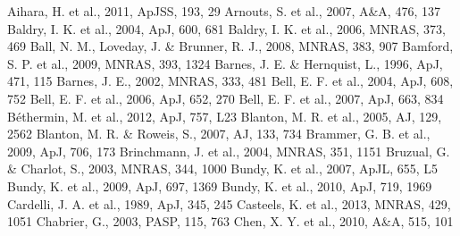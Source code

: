 \documentclass[useAMS,usenatbib]{mn2e}
\begin{document}
\begin{thebibliography}{}
 Aihara, H. et al., 2011, ApJSS, 193, 29
 Arnouts, S. et al., 2007, A\&A, 476, 137
 Baldry, I. K. et al., 2004, ApJ, 600, 681
 Baldry, I. K. et al., 2006, MNRAS, 373, 469
 Ball, N. M., Loveday, J. \& Brunner, R. J., 2008, MNRAS, 383, 907
 Bamford, S. P. et al., 2009, MNRAS, 393, 1324
 Barnes, J. E. \& Hernquist, L., 1996, ApJ, 471, 115
 Barnes, J. E., 2002, MNRAS, 333, 481
 Bell, E. F. et al., 2004, ApJ, 608, 752
 Bell, E. F. et al., 2006, ApJ, 652, 270
 Bell, E. F. et al., 2007, ApJ, 663, 834
 B\'ethermin, M. et al., 2012, ApJ, 757, L23
 Blanton, M. R. et al., 2005, AJ, 129, 2562
 Blanton, M. R. \& Roweis, S., 2007, AJ, 133, 734
 Brammer, G. B. et al., 2009, ApJ, 706, 173
 Brinchmann, J. et al., 2004, MNRAS, 351, 1151
 Bruzual, G. \& Charlot, S., 2003, MNRAS, 344, 1000
 Bundy, K. et al., 2007, ApJL, 655, L5
 Bundy, K. et al., 2009, ApJ, 697, 1369
 Bundy, K. et al., 2010, ApJ, 719, 1969
 Cardelli, J. A. et al., 1989, ApJ, 345, 245
 Casteels, K. et al., 2013, MNRAS, 429, 1051
 Chabrier, G., 2003, PASP, 115, 763
 Chen, X. Y. et al., 2010, A\&A, 515, 101

\end{thebibliography}
\end{document}
